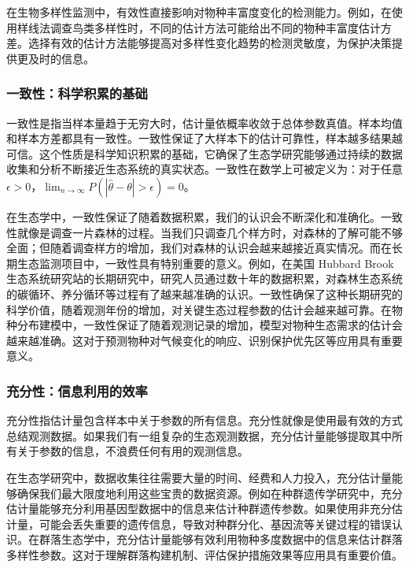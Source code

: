 \documentclass[
  twoside,12pt,fontset=none]{ctexbook}
\begin{document}
在生物多样性监测中，有效性直接影响对物种丰富度变化的检测能力。例如，在使用样线法调查鸟类多样性时，不同的估计方法可能给出不同的物种丰富度估计方差。选择有效的估计方法能够提高对多样性变化趋势的检测灵敏度，为保护决策提供更及时的信息。

\hypertarget{ux4e00ux81f4ux6027ux79d1ux5b66ux79efux7d2fux7684ux57faux7840}{%
\subsubsection{一致性：科学积累的基础}\label{ux4e00ux81f4ux6027ux79d1ux5b66ux79efux7d2fux7684ux57faux7840}}

一致性是指当样本量趋于无穷大时，估计量依概率收敛于总体参数真值。样本均值和样本方差都具有一致性。一致性保证了大样本下的估计可靠性，样本越多结果越可信。这个性质是科学知识积累的基础，它确保了生态学研究能够通过持续的数据收集和分析不断接近生态系统的真实状态。一致性在数学上可被定义为：对于任意\(\epsilon > 0\)，\(\lim_{n \to \infty} P(|\hat{\theta} - \theta| > \epsilon) = 0\)。

在生态学中，一致性保证了随着数据积累，我们的认识会不断深化和准确化。一致性就像是调查一片森林的过程。当我们只调查几个样方时，对森林的了解可能不够全面；但随着调查样方的增加，我们对森林的认识会越来越接近真实情况。而在长期生态监测项目中，一致性具有特别重要的意义。例如，在美国 Hubbard Brook 生态系统研究站的长期研究中，研究人员通过数十年的数据积累，对森林生态系统的碳循环、养分循环等过程有了越来越准确的认识。一致性确保了这种长期研究的科学价值，随着观测年份的增加，对关键生态过程参数的估计会越来越可靠。在物种分布建模中，一致性保证了随着观测记录的增加，模型对物种生态需求的估计会越来越准确。这对于预测物种对气候变化的响应、识别保护优先区等应用具有重要意义。

\hypertarget{ux5145ux5206ux6027ux4fe1ux606fux5229ux7528ux7684ux6548ux7387}{%
\subsubsection{充分性：信息利用的效率}\label{ux5145ux5206ux6027ux4fe1ux606fux5229ux7528ux7684ux6548ux7387}}

充分性指估计量包含样本中关于参数的所有信息。充分性就像是使用最有效的方式总结观测数据。如果我们有一组复杂的生态观测数据，充分估计量能够提取其中所有关于参数的信息，不浪费任何有用的观测信息。

在生态学研究中，数据收集往往需要大量的时间、经费和人力投入，充分估计量能够确保我们最大限度地利用这些宝贵的数据资源。例如在种群遗传学研究中，充分估计量能够充分利用基因型数据中的信息来估计种群遗传参数。如果使用非充分估计量，可能会丢失重要的遗传信息，导致对种群分化、基因流等关键过程的错误认识。在群落生态学中，充分估计量能够有效利用物种多度数据中的信息来估计群落多样性参数。这对于理解群落构建机制、评估保护措施效果等应用具有重要价值。
\end{document}
